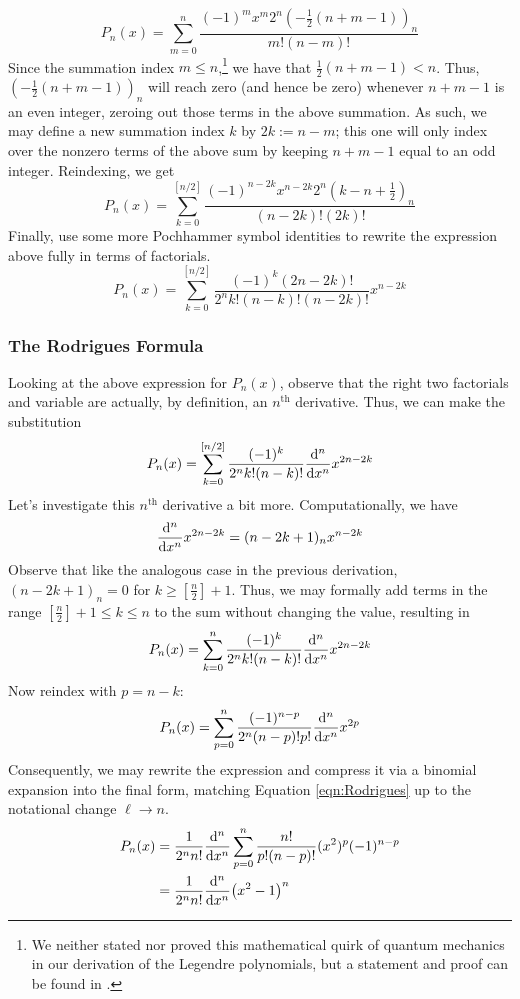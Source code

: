\documentclass[titlepage]{article}
\numberwithin{equation}{section}
\begin{document}
\begin{equation*}
    P_n(x) = \sum_{m=0}^n\frac{(-1)^mx^m2^n\left( -\tfrac{1}{2}(n+m-1) \right)_n}{m!(n-m)!}
\end{equation*}
Since the summation index $m\leq n$,\footnote{We neither stated nor proved this mathematical quirk of quantum mechanics in our derivation of the Legendre polynomials, but a statement and proof can be found in \textcite[32]{bib:FinalProject}.} we have that $\tfrac{1}{2}(n+m-1)<n$. Thus, $(-\tfrac{1}{2}(n+m-1))_n$ will reach zero (and hence be zero) whenever $n+m-1$ is an even integer, zeroing out those terms in the above summation. As such, we may define a new summation index $k$ by $2k:=n-m$; this one will only index over the nonzero terms of the above sum by keeping $n+m-1$ equal to an odd integer. Reindexing, we get
\begin{equation*}
    P_n(x) = \sum_{k=0}^{[n/2]}\frac{(-1)^{n-2k}x^{n-2k}2^n\left( k-n+\tfrac{1}{2} \right)_n}{(n-2k)!(2k)!}
\end{equation*}
Finally, use some more Pochhammer symbol identities to rewrite the expression above fully in terms of factorials.
\begin{equation*}
    P_n(x) = \sum_{k=0}^{[n/2]}\frac{(-1)^k(2n-2k)!}{2^nk!(n-k)!(n-2k)!}x^{n-2k}
\end{equation*}

\subsubsection{The Rodrigues Formula}
Looking at the above expression for $P_n(x)$, observe that the right two factorials and variable are actually, by definition, an $n^\text{th}$ derivative. Thus, we can make the substitution
\begin{equation*}
    P_n(x) = \sum_{k=0}^{[n/2]}\frac{(-1)^k}{2^nk!(n-k)!}\dv[n]{x}x^{2n-2k}
\end{equation*}
Let's investigate this $n^\text{th}$ derivative a bit more. Computationally, we have
\begin{equation*}
    \dv[n]{x}x^{2n-2k} = (n-2k+1)_nx^{n-2k}
\end{equation*}
Observe that like the analogous case in the previous derivation, $(n-2k+1)_n=0$ for $k\geq[\tfrac{n}{2}]+1$. Thus, we may formally add terms in the range $[\tfrac{n}{2}]+1\leq k\leq n$ to the sum without changing the value, resulting in
\begin{equation*}
    P_n(x) = \sum_{k=0}^n\frac{(-1)^k}{2^nk!(n-k)!}\dv[n]{x}x^{2n-2k}
\end{equation*}
Now reindex with $p=n-k$:
\begin{equation*}
    P_n(x) = \sum_{p=0}^n\frac{(-1)^{n-p}}{2^n(n-p)!p!}\dv[n]{x}x^{2p}
\end{equation*}
Consequently, we may rewrite the expression and compress it via a binomial expansion into the final form, matching Equation \ref{eqn:Rodrigues} up to the notational change $\ell\to n$.
\begin{align*}
    P_n(x) &= \frac{1}{2^nn!}\dv[n]{x}\sum_{p=0}^n\frac{n!}{p!(n-p)!}(x^2)^p(-1)^{n-p}\\
    &= \frac{1}{2^nn!}\dv[n]{x}(x^2-1)^n
\end{align*}
\end{document}
